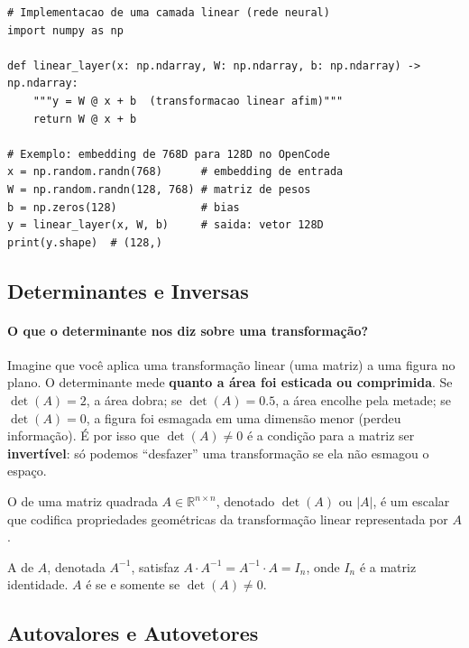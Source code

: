 \begin{lstlisting}[style=pythonstyle]
# Implementacao de uma camada linear (rede neural)
import numpy as np

def linear_layer(x: np.ndarray, W: np.ndarray, b: np.ndarray) -> np.ndarray:
    """y = W @ x + b  (transformacao linear afim)"""
    return W @ x + b

# Exemplo: embedding de 768D para 128D no OpenCode
x = np.random.randn(768)      # embedding de entrada
W = np.random.randn(128, 768) # matriz de pesos
b = np.zeros(128)             # bias
y = linear_layer(x, W, b)     # saida: vetor 128D
print(y.shape)  # (128,)
\end{lstlisting}

\subsection{Determinantes e Inversas}

\paragraph{O que o determinante nos diz sobre uma transformação?} Imagine
que você aplica uma transformação linear (uma matriz) a uma figura no plano.
O determinante mede \textbf{quanto a área foi esticada ou comprimida}. Se
$\det(A) = 2$, a área dobra; se $\det(A) = 0.5$, a área encolhe pela metade;
se $\det(A) = 0$, a figura foi esmagada em uma dimensão menor (perdeu
informação). É por isso que $\det(A) \neq 0$ é a condição para a matriz ser
\textbf{invertível}: só podemos ``desfazer'' uma transformação se ela não
esmagou o espaço.

\begin{definicao}[Determinante]
    O  de uma matriz quadrada $A \in \mathbb{R}^{n \times n}$,
    denotado $\det(A)$ ou $|A|$, é um escalar que codifica propriedades
    geométricas da transformação linear representada por $A$.
\end{definicao}

\begin{definicao}
    A  de $A$, denotada $A^{-1}$, satisfaz
    $A \cdot A^{-1} = A^{-1} \cdot A = I_n$, onde $I_n$ é a matriz
    identidade. $A$ é  se e somente se $\det(A) \neq 0$.
\end{definicao}

\subsection{Autovalores e Autovetores}

